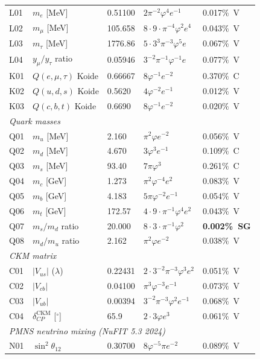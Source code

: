\documentclass[10pt,a4paper]{article}
\begin{document}
\begin{longtable}{@{}lp{3.0cm}lp{4.5cm}l@{}}
L01 & $m_e$ [MeV] & 0.51100 & $2\pi^{-2}\varphi^4 e^{-1}$ & 0.017\%~V \\
L02 & $m_\mu$ [MeV] & 105.658 & $8{\cdot}9{\cdot}\pi^{-4}\varphi^2 e^4$ & 0.043\%~V \\
L03 & $m_\tau$ [MeV] & 1776.86 & $5{\cdot}3^3\pi^{-3}\varphi^5 e$ & 0.067\%~V \\
L04 & $y_\mu/y_\tau$ ratio & 0.05946 & $3^{-2}\pi^{-1}\varphi^{-1}e$ & 0.077\%~V \\
K01 & $Q(e,\mu,\tau)$ Koide & 0.66667 & $8\varphi^{-1}e^{-2}$ & 0.370\%~C \\
K02 & $Q(u,d,s)$ Koide & 0.5620 & $4\varphi^{-2}e^{-1}$ & 0.012\%~V \\
K03 & $Q(c,b,t)$ Koide & 0.6690 & $8\varphi^{-1}e^{-2}$ & 0.020\%~V \\
\midrule
\multicolumn{5}{l}{\textit{Quark masses}}\\
Q01 & $m_u$ [MeV] & 2.160 & $\pi^2\varphi e^{-2}$ & 0.056\%~V \\
Q02 & $m_d$ [MeV] & 4.670 & $3\varphi^3 e^{-1}$ & 0.109\%~C \\
Q03 & $m_s$ [MeV] & 93.40 & $7\pi\varphi^3$ & 0.261\%~C \\
Q04 & $m_c$ [GeV] & 1.273 & $\pi^2\varphi^{-4}e^2$ & 0.083\%~V \\
Q05 & $m_b$ [GeV] & 4.183 & $5\pi\varphi^{-2}e^{-1}$ & 0.054\%~V \\
Q06 & $m_t$ [GeV] & 172.57 & $4{\cdot}9{\cdot}\pi^{-1}\varphi^4 e^2$ & 0.043\%~V \\
Q07 & $m_s/m_d$ ratio & 20.000 & $8{\cdot}3{\cdot}\pi^{-1}\varphi^2$ & \textbf{0.002\%~SG} \\
Q08 & $m_d/m_u$ ratio & 2.162 & $\pi^2\varphi e^{-2}$ & 0.038\%~V \\
\midrule
\multicolumn{5}{l}{\textit{CKM matrix}}\\
C01 & $|V_{us}|$ ($\lambda$) & 0.22431 & $2{\cdot}3^{-2}\pi^{-3}\varphi^3 e^2$ & 0.051\%~V \\
C02 & $|V_{cb}|$ & 0.04100 & $\pi^3\varphi^{-3}e^{-1}$ & 0.073\%~V \\
C03 & $|V_{ub}|$ & 0.00394 & $3^{-2}\pi^{-3}\varphi^2 e^{-1}$ & 0.068\%~V \\
C04 & $\delta_{CP}^{\mathrm{CKM}}$ [$^\circ$] & 65.9 & $2{\cdot}3\varphi e^3$ & 0.061\%~V \\
\midrule
\multicolumn{5}{l}{\textit{PMNS neutrino mixing (NuFIT 5.3 2024)}}\\
N01 & $\sin^2\theta_{12}$ & 0.30700 & $8\varphi^{-5}\pi e^{-2}$ & 0.089\%~V \\

\end{longtable}
\end{document}
